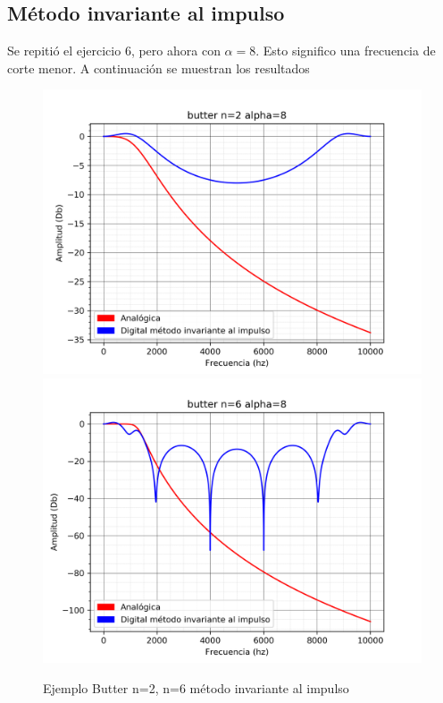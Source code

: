 \documentclass[assd_guia_filtros_recursivos_main.tex]{subfiles}
\begin{document}
\subsection{Método invariante al impulso}

Se repitió el ejercicio 6, pero ahora con $\alpha=8$. Esto significo una frecuencia de corte menor. A continuación se muestran los resultados


\begin{figure}[H]	
	\centering
	\includegraphics[scale=0.4]{output/butter/alpha=8/butter_n=2_alpha=8.png}
	\includegraphics[scale=0.4]{output/butter/alpha=8/butter_n=6_alpha=8.png}
	\caption{Ejemplo Butter n=2, n=6 método invariante al impulso}
	\label{fig:Caso 5}
\end{figure}
\end{document}
